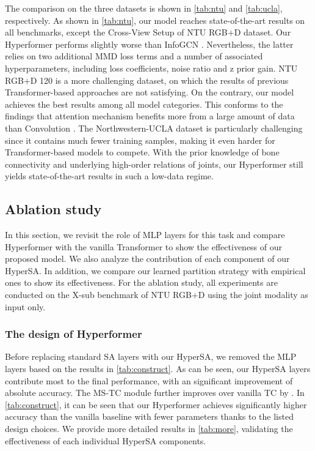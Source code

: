 \documentclass[10pt,twocolumn,letterpaper]{article}
\begin{document}
The comparison on the three datasets is shown in \cref{tab:ntu} and \cref{tab:ucla}, respectively. As shown in \cref{tab:ntu}, our model reaches state-of-the-art results on all benchmarks, except the Cross-View Setup of NTU RGB+D dataset. Our Hyperformer performs slightly worse than InfoGCN \cite{chi2022infogcn}. Nevertheless, the latter relies on two additional MMD loss terms and a number of associated hyperparameters, including loss coefficients, noise ratio and z prior gain. NTU RGB+D 120 is a more challenging dataset, on which the results of previous Transformer-based approaches are not satisfying. On the contrary, our model achieves the best results among all model categories. This conforms to the findings that attention mechanism benefits more from a large amount of data than Convolution \cite{dosovitskiy2021an, touvron2021training}. The Northwestern-UCLA dataset is particularly challenging since it contains much fewer training samples, making it even harder for Transformer-based models to compete. With the prior knowledge of bone connectivity and underlying high-order relations of joints, our Hyperformer still yields state-of-the-art results in such a low-data regime.









\subsection{Ablation study}
In this section, we revisit the role of MLP layers for this task and compare Hyperformer with the vanilla Transformer to show the effectiveness of our proposed model. We also analyze the contribution of each component of our HyperSA. In addition,
we compare our learned partition strategy with empirical ones to show its effectiveness.
For the ablation study, all experiments
are conducted on the
X-sub benchmark of NTU RGB+D using the joint modality as input only.





\subsubsection{The design of Hyperformer}
\label{sec:design}
Before replacing standard SA layers with our HyperSA, we removed the MLP layers based on the results in \cref{tab:construct}. As can be seen, our HyperSA layers contribute most to the final performance, with an significant improvement of  absolute accuracy. The MS-TC module further improves over vanilla TC by .
In \cref{tab:construct}, it can be seen that our Hyperformer achieves significantly higher accuracy than the vanilla baseline with fewer parameters thanks to the listed design choices. We provide more detailed results in \cref{tab:more}, validating the effectiveness of each individual HyperSA components. 
\end{document}
